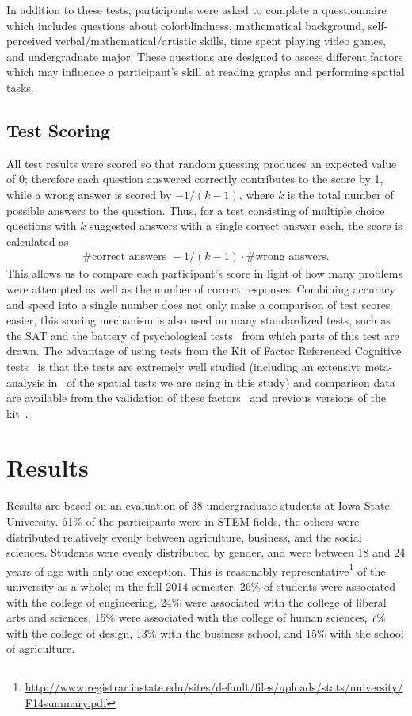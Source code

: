 \documentclass[11pt]{isuthesis}\usepackage[]{graphicx}\usepackage[]{color}
\begin{document}
In addition to these tests, participants were asked to complete a questionnaire which includes questions about colorblindness, mathematical background, self-perceived verbal/mathematical/artistic skills, time spent playing video games, and undergraduate major. 
These questions are designed to assess different factors which may influence a participant's skill at reading graphs and performing spatial tasks. 

\subsection{Test Scoring}\label{sec:scaling}

All test results were scored so that random guessing produces an expected value of 0; therefore each question answered correctly contributes to the score by 1, while a wrong answer is scored by $-1/(k-1)$, where $k$ is the total number of possible answers to the question. Thus, for a test consisting of multiple choice questions with $k$ suggested answers with a single correct answer each, the score is calculated as
\begin{eqnarray}\label{eq.scoring}
\# \text{correct answers } - 1/(k-1) \cdot \# \text{wrong answers}.
\end{eqnarray}
This allows us to compare each participant's score in light of how many problems were attempted as well as the number of correct responses. Combining accuracy and speed into a single number does not only make a comparison of test scores easier,  this scoring mechanism is also used on many standardized tests, such as the SAT and the battery of psychological tests~\citep{diamond1973correction, ekstrom1976manual} from which parts of this test are drawn. The advantage of using tests from the Kit of Factor Referenced Cognitive tests~\citep{ekstrom1976manual} is that the tests are extremely well studied (including an extensive meta-analysis in~\citep{voyer1995magnitude} of the spatial tests we are using in this study) and comparison data are available from the validation of these factors~\citep{schaie1998longitudinal,hampson1990variations,mayer1994whom} and previous versions of the kit~\citep{educational1963kit}.

\section{Results}\label{sec:results}
Results are based on an evaluation of 38 undergraduate students at Iowa State University. 61\% of the participants were in STEM fields, the others were distributed relatively evenly between agriculture, business, and the social sciences. Students were evenly distributed by gender, and were between 18 and 24 years of age with only one exception. This is reasonably representative\footnote{\url{http://www.registrar.iastate.edu/sites/default/files/uploads/stats/university/F14summary.pdf}} of the university as a whole; in the fall 2014 semester, 26\% of students were associated with the college of engineering, 24\% were associated with the college of liberal arts and sciences, 15\% were associated with the college of human sciences, 7\% with the college of design, 13\% with the business school, and 15\% with the school of agriculture.  
\end{document}
